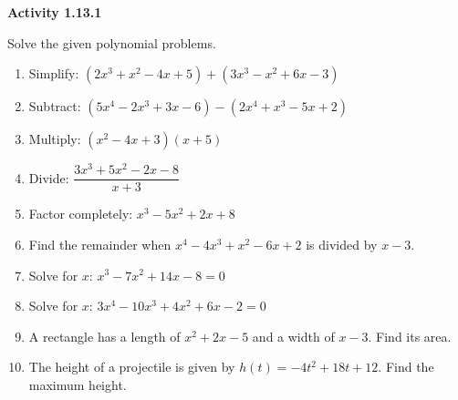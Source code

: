 \vspace{0.3ex}
\noindent\textbf{Activity 1.13.1}

\vspace{0.2ex}

Solve the given polynomial problems.
\begin{enumerate}
    \item Simplify: $(2x^3 + x^2 - 4x + 5) + (3x^3 - x^2 + 6x - 3)$
    \item Subtract: $(5x^4 - 2x^3 + 3x - 6) - (2x^4 + x^3 - 5x + 2)$
    \item Multiply: $(x^2 - 4x + 3)(x + 5)$
    \item Divide: $\dfrac{3x^3 + 5x^2 - 2x - 8}{x + 3}$
    \item Factor completely: $x^3 - 5x^2 + 2x + 8$
    \item Find the remainder when $x^4 - 4x^3 + x^2 - 6x + 2$ is divided by $x - 3$.
    \item Solve for $x$: $x^3 - 7x^2 + 14x - 8 = 0$
    \item Solve for $x$: $3x^4 - 10x^3 + 4x^2 + 6x - 2 = 0$
    \item A rectangle has a length of $x^2 + 2x - 5$ and a width of $x - 3$. Find its area.
    \item The height of a projectile is given by $h(t) = -4t^2 + 18t + 12$. Find the maximum height.
\end{enumerate}
